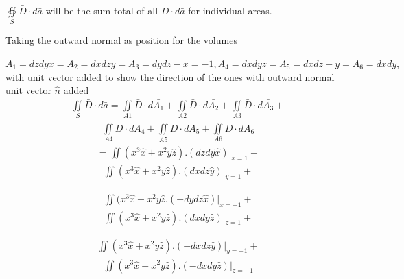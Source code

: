\begin{exmp}
	$\oiint\limits_S\bar{D}\cdot d\bar{a}$ will be the sum total of all ${D}\cdot d\bar{a}$ for individual areas.
	
	Taking the outward normal as position for the volumes
	
	 $A_1 = dzdyx=  A_2 = dxdzy= A_3 = dydz-x= -1, A_4 = dxdyz= A_5 = dxdz-y= A_6 = dxdy, $\\ with unit vector added to show the direction of the ones with outward normal unit vector $\hat{n}$ added
\begin{align*}
	\iint\limits_S\bar{D}\cdot d\bar{a} = \iint\limits_{A1}\bar{D}\cdot d\bar{A_1} +\iint\limits_{A2}\bar{D}\cdot d\bar{A_2}+ \iint\limits_{A3}\bar{D}\cdot d\bar{A_3}+ 
\end{align*}
\begin{align*}
		\iint\limits_{A4}\bar{D}\cdot d\bar{A_4}+ \iint\limits_{A5}\bar{D}\cdot d\bar{A_5}+ \iint\limits_{A6}\bar{D}\cdot d\bar{A_6}   
\end{align*}
\begin{align*}
=\iint\limits(x^3 \hat{x}+ x^2y\hat{z}).(dzdy\hat{x})|_{x=1}+
\end{align*}
\begin{align*}
 \iint\limits(x^3 \hat{x}+ x^2y\hat{z}).(dxdz\hat{y})|_{y=1}+
\end{align*}

\begin{align*}
\iint\limits(x^3 \hat{x}+ x^2y\hat{z}.(-dydz\hat{x})|_{x=-1}+
\end{align*}
\begin{align*}
\iint\limits(x^3 \hat{x}+ x^2y\hat{z}).(dxdy \hat{z})|_{z=1}+
\end{align*}

\begin{align*}
\iint\limits(x^3 \hat{x}+ x^2y\hat{z}).(-dxdz\hat{y})|_{y=-1}+
\end{align*}
\begin{align*}
\iint\limits(x^3 \hat{x}+ x^2y\hat{z}).(-dxdy\hat{z})|_{z=-1} 
\end{align*}


\end{exmp}
